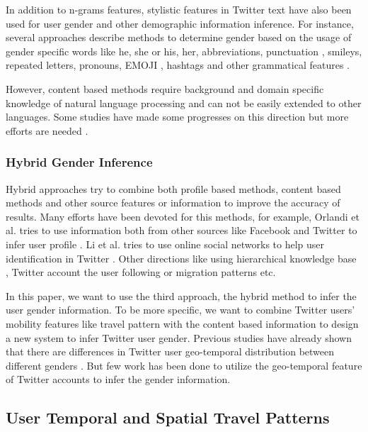 \documentclass{article}
\begin{document}
In addition to n-grams features, stylistic features in Twitter text have also been used for user gender and other demographic information inference. For instance, several approaches describe methods to determine gender based on the usage of gender specific words like he, she or his, her, abbreviations, punctuation \cite{fink2012inferring}, smileys, repeated letters, pronouns, EMOJI \cite{wolf2000emotional} , hashtags and other grammatical features \cite{cheng2011author,ito2013he}.

However, content based methods require background  and domain specific knowledge of natural language processing and can not be easily extended to other languages. Some studies have made some progresses on this direction but more efforts are needed \cite{mozetivc2016multilingual}.

\subsubsection{Hybrid  Gender Inference}

Hybrid approaches try to combine both profile based methods, content based methods and other source features or information to improve the accuracy of results. Many efforts have been devoted for this methods, for example,  Orlandi et al. tries to use information both from other sources like Facebook and Twitter to infer user profile \cite{orlandi2012aggregated}. Li et al. tries to use online social networks to help user identification in Twitter \cite{li2017solution}. Other directions like using hierarchical knowledge base \cite{kapanipathi2014user},  Twitter account the user following \cite{chamberlain2016probabilistic} or migration patterns \cite{zagheni2014inferring} etc.

In this paper, we want to use the third approach, the hybrid method to infer the user gender information. To be more specific,  we want to combine Twitter users' mobility features like travel pattern with the content based information to design a new system to infer Twitter user gender. Previous studies have already shown that there are differences in Twitter user geo-temporal distribution between different genders \cite{graham2014world,mahmud2014home,weber2014visualizing, longley2016geo}. But few work has been done to utilize the geo-temporal feature of Twitter accounts to infer the gender information.

\subsection{User Temporal and Spatial Travel Patterns}
\end{document}
